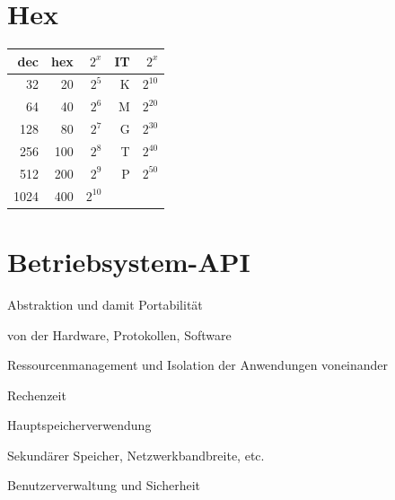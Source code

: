 


\newcommand{\SUBJECT}{}
\newcommand{\TITLE}{Cheat Sheet Bsys2}



%


\begin{multicols*}{5}
    \setlength{\columnseprule}{0.4pt}
        \footnotesize

% 

\section{Hex}
\begin{tabular}{r  r  r | r r}
		dec & hex& $2^x$& IT& $2^x$\\
		\hline
			32&20&$2^5$&K&$2^{10}$\\
			64&40&$2^6$&M&$2^{20}$\\
			128&80&$2^7$&G&$2^{30}$\\
			256&100&$2^8$&T&$2^{40}$\\
			512&200&$2^9$&P&$2^{50}$\\
			1024&400&$2^{10}$
		\end{tabular}
		
		\vspace{-1pt}
		
\section{Betriebsystem-API}

    \begin{compactitem}[$\bullet$]
        \item Abstraktion und damit Portabilität
        \begin{compactitem}
            \item von der Hardware, Protokollen, Software
        \end{compactitem}
        \item Ressourcenmanagement und Isolation der Anwendungen voneinander
        \begin{compactitem}
            \item Rechenzeit
            \item Hauptspeicherverwendung
            \item Sekundärer Speicher, Netzwerkbandbreite, etc.
        \end{compactitem}
        \item Benutzerverwaltung und Sicherheit
    \end{compactitem}



\end{multicols*}
